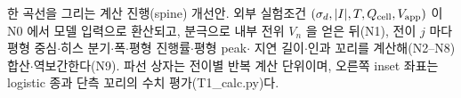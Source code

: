 \caption{한 곡선을 그리는 계산 진행(spine) 개선안. 외부 실험조건 $(\sigma_d,|I|,T,Q_\cell,V_\app)$ 이 N0 에서 모델 입력으로 환산되고,
분극으로 내부 전위 $V_n$ 을 얻은 뒤(N1), 전이 $j$ 마다 평형 중심$\cdot$히스 분기$\cdot$폭$\cdot$평형 진행률$\cdot$평형 peak$\cdot$
지연 길이$\cdot$인과 꼬리를 계산해(N2--N8) 합산$\cdot$역보간한다(N9). 파선 상자는 전이별 반복 계산 단위이며,
오른쪽 inset 좌표는 logistic 종과 단측 꼬리의 수치 평가(T1\_calc.py)다.}
\label{fig:spine}
